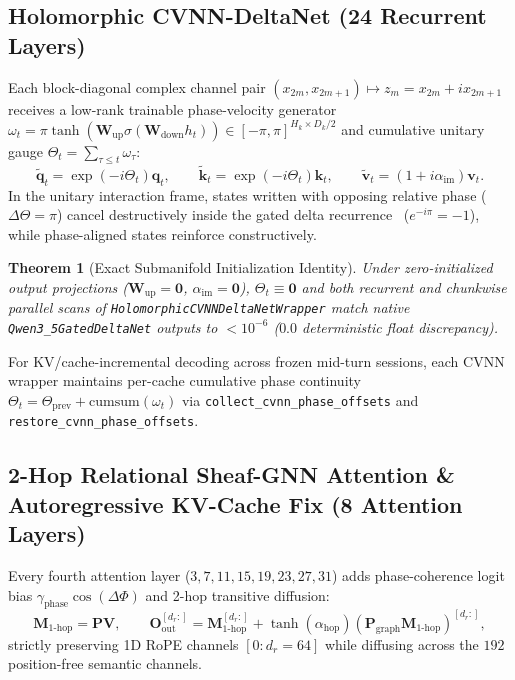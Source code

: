 \documentclass[11pt,a4paper]{article}
\newtheorem{theorem}{Theorem}
\begin{document}
\subsection{Holomorphic CVNN-DeltaNet (24 Recurrent Layers)}
Each block-diagonal complex channel pair $(x_{2m}, x_{2m+1}) \mapsto z_m = x_{2m} + i x_{2m+1}$ receives a low-rank trainable phase-velocity generator $\omega_t = \pi \tanh(\mathbf{W}_{\text{up}} \sigma(\mathbf{W}_{\text{down}} h_t)) \in [-\pi, \pi]^{H_k \times D_k/2}$ and cumulative unitary gauge $\Theta_t = \sum_{\tau \le t} \omega_\tau$:
\begin{equation}
\tilde{\mathbf{q}}_t = \exp(-i \Theta_t)\mathbf{q}_t, \qquad \tilde{\mathbf{k}}_t = \exp(-i \Theta_t)\mathbf{k}_t, \qquad \tilde{\mathbf{v}}_t = (1 + i \alpha_{\text{im}})\mathbf{v}_t.
\end{equation}
In the unitary interaction frame, states written with opposing relative phase ($\Delta \Theta = \pi$) cancel destructively inside the gated delta recurrence~\cite{yang2024gateddelta} ($e^{-i\pi} = -1$), while phase-aligned states reinforce constructively.

\begin{theorem}[Exact Submanifold Initialization Identity]
Under zero-initialized output projections ($\mathbf{W}_{\text{up}} = \mathbf{0}$, $\alpha_{\text{im}} = \mathbf{0}$), $\Theta_t \equiv \mathbf{0}$ and both recurrent and chunkwise parallel scans of \texttt{HolomorphicCVNNDeltaNetWrapper} match native \texttt{Qwen3\_5GatedDeltaNet} outputs to $<10^{-6}$ ($0.0$ deterministic float discrepancy).
\end{theorem}

For KV/cache-incremental decoding across frozen mid-turn sessions, each CVNN wrapper maintains per-cache cumulative phase continuity $\Theta_t = \Theta_{\text{prev}} + \mathrm{cumsum}(\omega_t)$ via \texttt{collect\_cvnn\_phase\_offsets} and \texttt{restore\_cvnn\_phase\_offsets}.

\subsection{2-Hop Relational Sheaf-GNN Attention \& Autoregressive KV-Cache Fix (8 Attention Layers)}
Every fourth attention layer ($3, 7, 11, 15, 19, 23, 27, 31$) adds phase-coherence logit bias $\gamma_{\text{phase}} \cos(\Delta\Phi)$ and 2-hop transitive diffusion:
\begin{equation}
\mathbf{M}_{1\text{-hop}} = \mathbf{P} \mathbf{V}, \qquad \mathbf{O}_{\text{out}}^{[d_r:]} = \mathbf{M}_{1\text{-hop}}^{[d_r:]} + \tanh(\alpha_{\text{hop}})\left(\mathbf{P}_{\text{graph}} \mathbf{M}_{1\text{-hop}}\right)^{[d_r:]},
\end{equation}
strictly preserving 1D RoPE channels $[0 : d_r=64]$ while diffusing across the $192$ position-free semantic channels.
\end{document}
